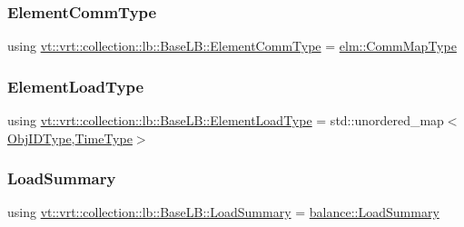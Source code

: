 \subsubsection{\texorpdfstring{Element\+Comm\+Type}{ElementCommType}}
{\footnotesize\ttfamily using \hyperlink{structvt_1_1vrt_1_1collection_1_1lb_1_1_base_l_b_a83eb4daec14edfb8780422e95b8e38d3}{vt\+::vrt\+::collection\+::lb\+::\+Base\+L\+B\+::\+Element\+Comm\+Type} =  \hyperlink{namespacevt_1_1elm_a38487cb8896b9b4763efa9022fab560e}{elm\+::\+Comm\+Map\+Type}}

\mbox{\label{structvt_1_1vrt_1_1collection_1_1lb_1_1_base_l_b_aa286d31a0820a8fc9218ccb858368fca}} 
\subsubsection{\texorpdfstring{Element\+Load\+Type}{ElementLoadType}}
{\footnotesize\ttfamily using \hyperlink{structvt_1_1vrt_1_1collection_1_1lb_1_1_base_l_b_aa286d31a0820a8fc9218ccb858368fca}{vt\+::vrt\+::collection\+::lb\+::\+Base\+L\+B\+::\+Element\+Load\+Type} =  std\+::unordered\+\_\+map$<$\hyperlink{structvt_1_1vrt_1_1collection_1_1lb_1_1_base_l_b_a790b22acf448880599724749cdc4e9b3}{Obj\+I\+D\+Type},\hyperlink{namespacevt_a876a9d0cd5a952859c72de8a46881442}{Time\+Type}$>$}

\mbox{\label{structvt_1_1vrt_1_1collection_1_1lb_1_1_base_l_b_aa78583f362acc50fcca87d4ce3150151}} 
\subsubsection{\texorpdfstring{Load\+Summary}{LoadSummary}}
{\footnotesize\ttfamily using \hyperlink{structvt_1_1vrt_1_1collection_1_1lb_1_1_base_l_b_aa78583f362acc50fcca87d4ce3150151}{vt\+::vrt\+::collection\+::lb\+::\+Base\+L\+B\+::\+Load\+Summary} =  \hyperlink{structvt_1_1vrt_1_1collection_1_1balance_1_1_load_summary}{balance\+::\+Load\+Summary}}

